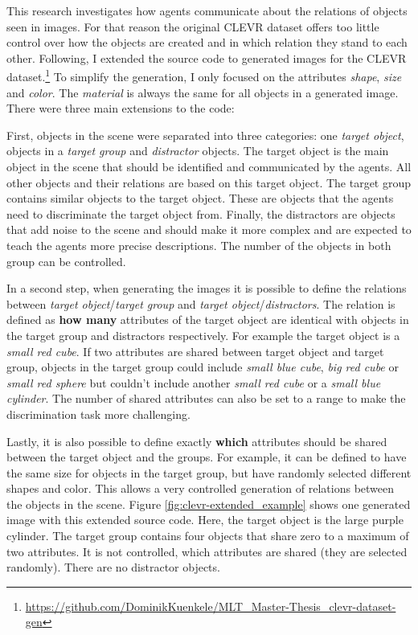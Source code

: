 
This research investigates how agents communicate about the relations of objects seen in images.
For that reason the original CLEVR dataset offers too little control over how the objects are created and in which relation they stand to each other.
Following, I extended the source code to generated images for the CLEVR dataset.\footnote{\href{https://github.com/DominikKuenkele/MLT\_Master-Thesis\_clevr-dataset-gen}{https://github.com/DominikKuenkele/MLT\_Master-Thesis\_clevr-dataset-gen}}
To simplify the generation, I only focused on the attributes \emph{shape}, \emph{size} and \emph{color}.
The \emph{material} is always the same for all objects in a generated image.
There were three main extensions to the code:

First, objects in the scene were separated into three categories: one \emph{target object}, objects in a \emph{target group} and \emph{distractor} objects.
The target object is the main object in the scene that should be identified and communicated by the agents.
All other objects and their relations are based on this target object.
The target group contains similar objects to the target object.
These are objects that the agents need to discriminate the target object from.
Finally, the distractors are objects that add noise to the scene and should make it more complex and are expected to teach the agents more precise descriptions.
The number of the objects in both group can be controlled.

In a second step, when generating the images it is possible to define the relations between \emph{target object}/\emph{target group} and \emph{target object}/\emph{distractors}.
The relation is defined as \textbf{how many} attributes of the target object are identical with objects in the target group and distractors respectively.
For example the target object is a \emph{small red cube}.
If two attributes are shared between target object and target group, objects in the target group could include \emph{small blue cube}, \emph{big red cube} or \emph{small red sphere} but couldn't include another \emph{small red cube} or a \emph{small blue cylinder}.
The number of shared attributes can also be set to a range to make the discrimination task more challenging.

Lastly, it is also possible to define exactly \textbf{which} attributes should be shared between the target object and the groups.
For example, it can be defined to have the same size for objects in the target group, but have randomly selected different shapes and color.
This allows a very controlled generation of relations between the objects in the scene.
Figure \ref{fig:clevr-extended_example} shows one generated image with this extended source code.
Here, the target object is the large purple cylinder.
The target group contains four objects that share zero to a maximum of two attributes.
It is not controlled, which attributes are shared (they are selected randomly).
There are no distractor objects.

